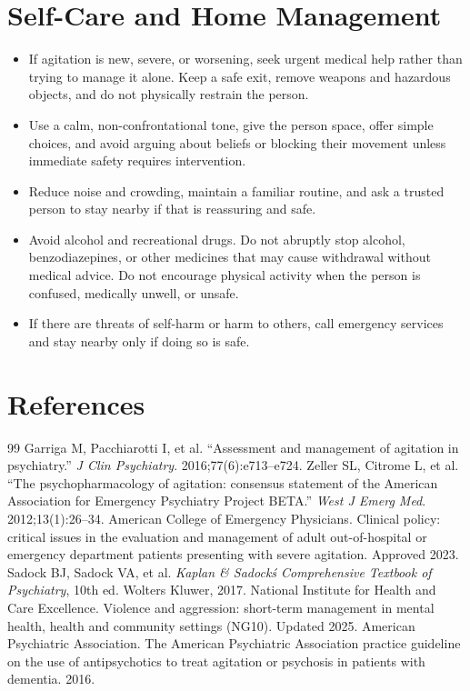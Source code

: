 \section*{Self-Care and Home Management}
\begin{itemize}
 \item If agitation is new, severe, or worsening, seek urgent medical help rather than trying to manage it alone. Keep a safe exit, remove weapons and hazardous objects, and do not physically restrain the person.
 \item Use a calm, non-confrontational tone, give the person space, offer simple choices, and avoid arguing about beliefs or blocking their movement unless immediate safety requires intervention.
 \item Reduce noise and crowding, maintain a familiar routine, and ask a trusted person to stay nearby if that is reassuring and safe.
 \item Avoid alcohol and recreational drugs. Do not abruptly stop alcohol, benzodiazepines, or other medicines that may cause withdrawal without medical advice. Do not encourage physical activity when the person is confused, medically unwell, or unsafe.
 \item If there are threats of self-harm or harm to others, call emergency services and stay nearby only if doing so is safe.
\end{itemize}

\section*{References}
\begin{thebibliography}{99}
 Garriga M, Pacchiarotti I, et al. ``Assessment and management of agitation in psychiatry.'' \textit{J Clin Psychiatry}. 2016;77(6):e713--e724.
 Zeller SL, Citrome L, et al. ``The psychopharmacology of agitation: consensus statement of the American Association for Emergency Psychiatry Project BETA.'' \textit{West J Emerg Med}. 2012;13(1):26--34.
 American College of Emergency Physicians. Clinical policy: critical issues in the evaluation and management of adult out-of-hospital or emergency department patients presenting with severe agitation. Approved 2023.
 Sadock BJ, Sadock VA, et al. \textit{Kaplan \& Sadock\'s Comprehensive Textbook of Psychiatry}, 10th ed. Wolters Kluwer, 2017.
 National Institute for Health and Care Excellence. Violence and aggression: short-term management in mental health, health and community settings (NG10). Updated 2025.
 American Psychiatric Association. The American Psychiatric Association practice guideline on the use of antipsychotics to treat agitation or psychosis in patients with dementia. 2016.
\end{thebibliography}
